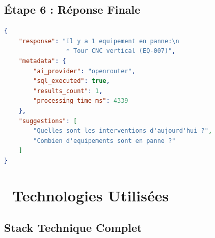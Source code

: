 \documentclass[12pt,a4paper]{article}
\begin{document}
\subsection{Étape 6 : Réponse Finale}

\begin{lstlisting}[language=JSON, caption=Réponse du chatbot]
{
    "response": "Il y a 1 equipement en panne:\n
                 * Tour CNC vertical (EQ-007)",
    "metadata": {
        "ai_provider": "openrouter",
        "sql_executed": true,
        "results_count": 1,
        "processing_time_ms": 4339
    },
    "suggestions": [
        "Quelles sont les interventions d'aujourd'hui ?",
        "Combien d'equipements sont en panne ?"
    ]
}
\end{lstlisting}

\newpage

\section{\faTools\ Technologies Utilisées}

\subsection{Stack Technique Complet}
\end{document}
